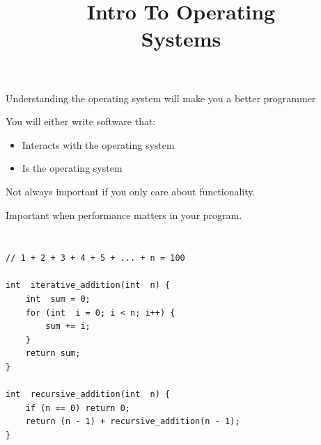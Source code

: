 

\title{Intro To Operating\\Systems}



\begin{frame}
	\titlepage
\end{frame}

\begin{slide}
  

	Understanding the operating system will make you a better programmer
	\bigskip

	You will either write software that:
	\begin{itemize}
		\item Interacts with the operating system
		\item Is the operating system
	\end{itemize}
  
	\bigskip
	
	Not always important if you only care about functionality.
	\medskip
	
	Important when performance matters in your program.
	
\end{slide}

\begin{slide}

	
	\inputminted{c}{2d-array-row.c}
	
	\bigskip
	
	\inputminted{c}{2d-array-col.c}
	
\end{slide}

\begin{slide}


\begin{verbatim}
// 1 + 2 + 3 + 4 + 5 + ... + n = 100

int  iterative_addition(int  n) {
    int  sum = 0;
    for (int  i = 0; i < n; i++) {
        sum += i;
    }
    return sum;
}

int  recursive_addition(int  n) {
    if (n == 0) return 0;
    return (n - 1) + recursive_addition(n - 1);
}
\end{verbatim}
	
\end{slide}


